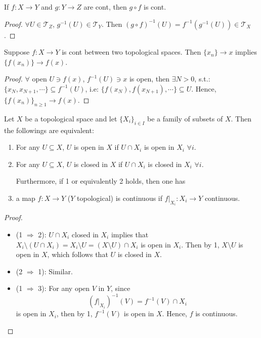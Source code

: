 \begin{proposition}
    If $f: X \rightarrow Y$ and $g: Y\rightarrow Z$ are cont, then $g \circ f$ is cont.
\end{proposition}

\begin{proof}
    $\forall U \in \mathcal{T}_Z$, $g^{-1}(U) \in \mathcal{T}_Y$. Then $(g\circ f)^{-1}(U)= f^{-1}(g^{-1}(U)) \in \mathcal{T}_X$.
\end{proof}

\begin{proposition}
    Suppose $f: X\rightarrow Y$ is cont between two topological spaces. Then $\{x_n\} \rightarrow x$ implies $\{f(x_n)\} \rightarrow f(x)$.
\end{proposition}


\begin{proof}
    $\forall$ open $U\ni f(x)$, $f^{-1}(U) \ni x$ is open, then $\exists N>0$, s.t.: $\{x_N, x_{N+1}, \cdots\} \subseteq f^{-1}(U)$, i.e: $\{f(x_N), f(x_{N+1}), \cdots\} \subseteq U$. Hence, $\{f(x_n)\}_{n\geq 1} \rightarrow f(x)$.
\end{proof}

\begin{lemma}
    Let $X$ be a topological space and let $\{ X_i\}_{i \in I}$ be a family of subsets of $X$. Then the followings are equivalent:
    \begin{enumerate}
        \item For any $U \subseteq X$, $U$ is open in $X$ if $U \cap X_i$ is open in $X_i$ $\forall i$.
        \item For any $U \subseteq X$, $U$ is closed in $X$ if $U \cap X_i$ is closed in $X_i$ $\forall i$.

        \noindent Furthermore, if 1 or equivalently 2 holds, then one has

        \item a map $f : X \to Y$ ($Y$ topological) is continuous if $f |_{X_i} : X_i \to Y$ continuous.
    \end{enumerate}
\end{lemma}

\begin{proof}
    \begin{itemize}
        \item (1 $\Rightarrow$ 2): $U \cap X_i$ closed in $X_i$ implies that $X_i \setminus (U \cap X_i) = X_i \setminus U = (X \setminus U) \cap X_i$ is open in $X_i$. Then by 1, $X \setminus U$ is open in $X$, which follows that $U$ is closed in $X$.

        \item (2 $\Rightarrow $ 1): Similar.

        \item (1 $\Rightarrow $ 3): For any open $V$ in $Y$, since
        $$(f|_{X_i})^{-1} (V) = f^{-1}(V) \cap X_i$$
        is open in $X_i$, then by 1, $f^{-1}(V)$ is open in $X$. Hence, $f$ is continuous.
    \end{itemize}
\end{proof}

